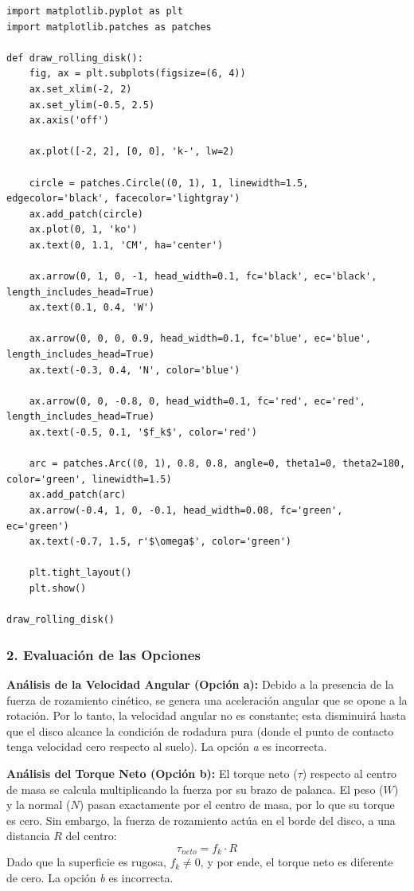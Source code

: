 \documentclass[12pt, a4paper]{article}
\begin{document}
\begin{lstlisting}
import matplotlib.pyplot as plt
import matplotlib.patches as patches

def draw_rolling_disk():
    fig, ax = plt.subplots(figsize=(6, 4))
    ax.set_xlim(-2, 2)
    ax.set_ylim(-0.5, 2.5)
    ax.axis('off')

    ax.plot([-2, 2], [0, 0], 'k-', lw=2)

    circle = patches.Circle((0, 1), 1, linewidth=1.5, edgecolor='black', facecolor='lightgray')
    ax.add_patch(circle)
    ax.plot(0, 1, 'ko')
    ax.text(0, 1.1, 'CM', ha='center')

    ax.arrow(0, 1, 0, -1, head_width=0.1, fc='black', ec='black', length_includes_head=True)
    ax.text(0.1, 0.4, 'W')

    ax.arrow(0, 0, 0, 0.9, head_width=0.1, fc='blue', ec='blue', length_includes_head=True)
    ax.text(-0.3, 0.4, 'N', color='blue')

    ax.arrow(0, 0, -0.8, 0, head_width=0.1, fc='red', ec='red', length_includes_head=True)
    ax.text(-0.5, 0.1, '$f_k$', color='red')

    arc = patches.Arc((0, 1), 0.8, 0.8, angle=0, theta1=0, theta2=180, color='green', linewidth=1.5)
    ax.add_patch(arc)
    ax.arrow(-0.4, 1, 0, -0.1, head_width=0.08, fc='green', ec='green')
    ax.text(-0.7, 1.5, r'$\omega$', color='green')

    plt.tight_layout()
    plt.show()

draw_rolling_disk()
\end{lstlisting}

\subsubsection*{2. Evaluación de las Opciones}

\textbf{Análisis de la Velocidad Angular (Opción a):}
Debido a la presencia de la fuerza de rozamiento cinético, se genera una aceleración angular que se opone a la rotación. Por lo tanto, la velocidad angular no es constante; esta disminuirá hasta que el disco alcance la condición de rodadura pura (donde el punto de contacto tenga velocidad cero respecto al suelo). La opción \textit{a} es incorrecta.

\textbf{Análisis del Torque Neto (Opción b):}
El torque neto ($\tau$) respecto al centro de masa se calcula multiplicando la fuerza por su brazo de palanca. El peso ($W$) y la normal ($N$) pasan exactamente por el centro de masa, por lo que su torque es cero. Sin embargo, la fuerza de rozamiento actúa en el borde del disco, a una distancia $R$ del centro:
$$\tau_{neto} = f_k \cdot R$$
Dado que la superficie es rugosa, $f_k \neq 0$, y por ende, el torque neto es diferente de cero. La opción \textit{b} es incorrecta.
\end{document}
